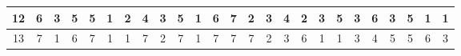 \begin{sidewaystable}[]
\begin{tabular}{|c|c|c|c|c|c|c|c|c|c|c|c|c|c|c|c|c|c|c|c|c|c|c|c|c|}
    12      & 6                                               & 3                                               & 5                                               & 5                                               & 1                                               & 2                                               & 4                                               & 3                                               & 5                                               & 1                                                & 6                                                & 7                                                & 2                                               & 3                                               & 4                                               & 2                                               & 3                                               & 5                                               & 3                                               & 6                                               & 3                                               & 5                                                & 1                                                & 1                                                \\ \hline
    13      & 7                                               & 1                                               & 6                                               & 7                                               & 1                                               & 1                                               & 7                                               & 2                                               & 7                                               & 1                                                & 7                                                & 7                                                & 7                                               & 2                                               & 3                                               & 6                                               & 1                                               & 1                                               & 3                                               & 4                                               & 5                                               & 5                                                & 6                                                & 3                                                \\ \hline

\end{tabular}
\end{sidewaystable}
